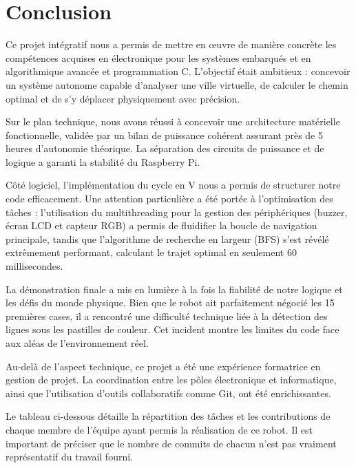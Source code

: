 \chapter*{Conclusion}

Ce projet intégratif nous a permis de mettre en \oe uvre de manière concrète les compétences acquises en électronique pour les systèmes embarqués et en algorithmique avancée et programmation C. L'objectif était ambitieux : concevoir un système autonome capable d'analyser une ville virtuelle, de calculer le chemin optimal et de s'y déplacer physiquement avec précision.

Sur le plan technique, nous avons réussi à concevoir une architecture matérielle fonctionnelle, validée par un bilan de puissance cohérent assurant près de 5 heures d'autonomie théorique. La séparation des circuits de puissance et de logique a garanti la stabilité du Raspberry Pi. 

Côté logiciel, l'implémentation du cycle en V nous a permis de structurer notre code efficacement. Une attention particulière a été portée à l'optimisation des tâches : l'utilisation du multithreading pour la gestion des périphériques (buzzer, écran LCD et capteur RGB) a permis de fluidifier la boucle de navigation principale, tandis que l'algorithme de recherche en largeur (BFS) s'est révélé extrêmement performant, calculant le trajet optimal en seulement 60 millisecondes.

La démonstration finale a mis en lumière à la fois la fiabilité de notre logique et les défis du monde physique. Bien que le robot ait parfaitement négocié les 15 premières cases, il a rencontré une difficulté technique liée à la détection des lignes sous les pastilles de couleur. Cet incident montre les limites du code face aux aléas de l'environnement réel.

Au-delà de l'aspect technique, ce projet a été une expérience formatrice en gestion de projet. La coordination entre les pôles électronique et informatique, ainsi que l'utilisation d'outils collaboratifs comme Git, ont été enrichissantes.

Le tableau ci-dessous détaille la répartition des tâches et les contributions de chaque membre de l'équipe ayant permis la réalisation de ce robot. Il est important de préciser que le nombre de commits de chacun n'est pas vraiment représentatif du travail fourni.

\vspace{0.5cm}

